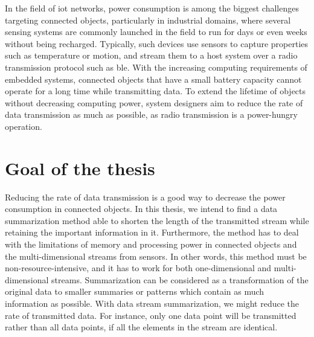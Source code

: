 In the field of \acrshort{iot} networks, power consumption is among the biggest
challenges targeting connected objects, particularly in industrial domains,
where several sensing systems are commonly launched in the field to run for days
or even weeks without being recharged. Typically, such devices use sensors to
capture properties such as temperature or motion, and stream them to a host
system over a radio transmission protocol such as \acrfull{ble}. With the
increasing computing requirements of embedded systems, connected objects that
have a small battery capacity cannot operate for a long time while transmitting
data. To extend the lifetime of objects without decreasing computing power,
system designers aim to reduce the rate of data transmission as much as
possible, as radio transmission is a power-hungry operation.


\section{Goal of the thesis}

Reducing the rate of data transmission is a good way to decrease the power
consumption in connected objects. In this thesis, we intend to find a data
summarization method able to shorten the length of the transmitted stream while
retaining the important information in it. Furthermore, the method has to deal
with the limitations of memory and processing power in connected objects and the
multi-dimensional streams from sensors. In other words, this method must be
non-resource-intensive, and it has to work for both one-dimensional and
multi-dimensional streams.
Summarization can be considered as a transformation of the original data to
smaller summaries or patterns which contain as much information as possible.
With data stream summarization, we might reduce the rate of transmitted data.
For instance, only one data point will be transmitted rather than all data
points, if all the elements in the stream are identical. 

